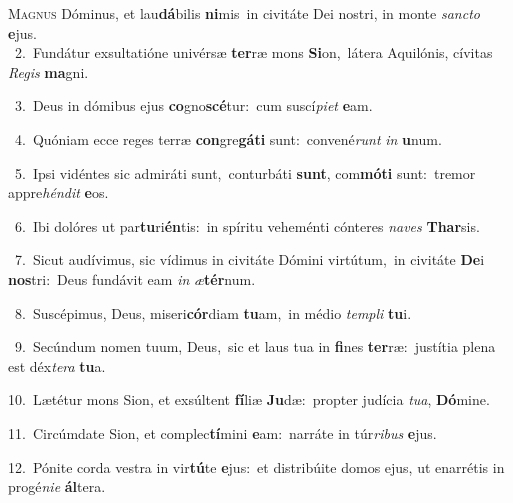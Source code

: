 \lettrine{\initial\textcolor{\initialcolor}{M}}{agnus} Dóminus, et lau\-\textbf{dá}\-bilis \textbf{ni}\-mis~\star in civitáte Dei nostri, in monte \textit{sanc}\-\textit{to} \textbf{e}\-jus.\\
{\numbfont\textcolor{\numbcolor}{~2.}}~Fundátur exsultatióne univérsæ \textbf{ter}\-ræ mons \textbf{Si}\-on,~\star látera Aquilónis, cívitas \textit{Re}\-\textit{gis} \textbf{ma}\-gni.\par
{\numbfont\textcolor{\numbcolor}{~3.}}~Deus in dómibus ejus \textbf{co}\-gno\-\textbf{scé}\-tur:~\star cum suscí\-\textit{pi}\-\textit{et} \textbf{e}\-am.\par
{\numbfont\textcolor{\numbcolor}{~4.}}~Quóniam ecce reges terræ \textbf{con}\-gre\-\textbf{gá}\-\textbf{ti} sunt:~\star convené\textit{runt} \textit{in} \textbf{u}\-num.\par
{\numbfont\textcolor{\numbcolor}{~5.}}~Ipsi vidéntes sic admiráti sunt,~\dagger conturbáti \textbf{sunt}\-, com\-\textbf{mó}\-\textbf{ti} sunt:~\star tremor appre\-\textit{hén}\-\textit{dit} \textbf{e}\-os.\par
{\numbfont\textcolor{\numbcolor}{~6.}}~Ibi dolóres ut par\-\textbf{tu}\-ri\-\textbf{én}\-tis:~\star in spíritu veheménti cónteres \textit{na}\-\textit{ves} \textbf{Thar}\-sis.\par
{\numbfont\textcolor{\numbcolor}{~7.}}~Sicut audívimus, sic vídimus in civitáte Dómini virtútum,~\dagger in civitáte \textbf{De}\-i \textbf{nos}\-tri:~\star Deus fundávit eam \textit{in} \textit{æ}\-\textbf{tér}num.\par
{\numbfont\textcolor{\numbcolor}{~8.}}~Suscépimus, Deus, miseri\-\textbf{cór}\-diam \textbf{tu}\-am,~\star in médio \textit{tem}\-\textit{pli} \textbf{tu}\-i.\par
{\numbfont\textcolor{\numbcolor}{~9.}}~Secúndum nomen tuum, Deus,~\dagger sic et laus tua in \textbf{fi}\-nes \textbf{ter}\-ræ:~\star justítia plena est déx\-\textit{te}\-\textit{ra} \textbf{tu}\-a.\par
{\numbfont\textcolor{\numbcolor}{10.}}~Lætétur mons Sion, et exsúltent \textbf{fí}\-liæ \textbf{Ju}\-dæ:~\star propter judícia \textit{tu}\-\textit{a}, \textbf{Dó}\-mine.\par
{\numbfont\textcolor{\numbcolor}{11.}}~Circúmdate Sion, et complec\-\textbf{tí}\-mini \textbf{e}\-am:~\star narráte in túr\-\textit{ri}\-\textit{bus} \textbf{e}\-jus.\par
{\numbfont\textcolor{\numbcolor}{12.}}~Pónite corda vestra in vir\-\textbf{tú}\-te \textbf{e}\-jus:~\star et distribúite domos ejus, ut enarrétis in progé\-\textit{ni}\-\textit{e} \textbf{ál}\-tera.\par
